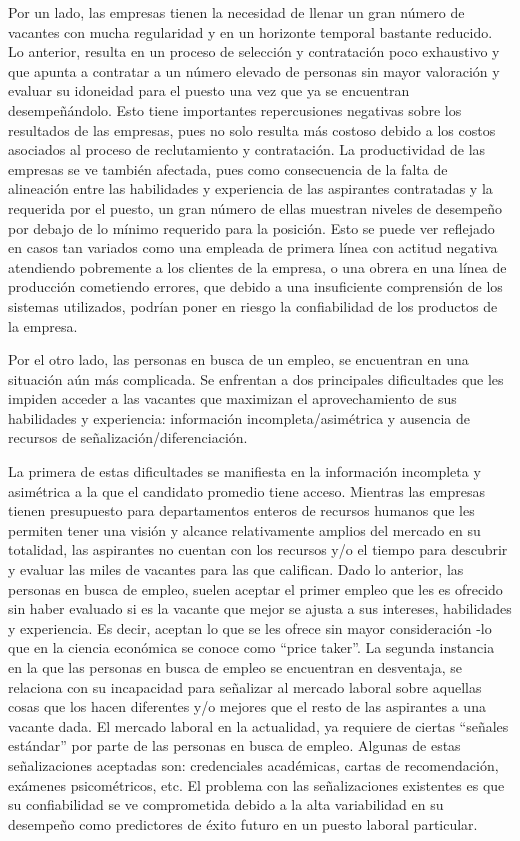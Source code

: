 Por un lado, las empresas tienen la necesidad de llenar un gran número de vacantes con mucha regularidad y en un horizonte temporal bastante reducido. Lo anterior, resulta en un proceso de selección y contratación poco exhaustivo y que apunta a contratar a un número elevado de personas sin mayor valoración y evaluar su idoneidad para el puesto una vez que ya se encuentran desempeñándolo. Esto tiene importantes repercusiones negativas sobre los resultados de las empresas, pues no solo resulta más costoso debido a los costos asociados al proceso de reclutamiento y contratación. La productividad de las empresas se ve también afectada, pues como consecuencia de la falta de alineación entre las habilidades y experiencia de las aspirantes contratadas y la requerida por el puesto, un gran número de ellas muestran niveles de desempeño por debajo de lo mínimo requerido para la posición. Esto se puede ver reflejado en casos tan variados como una empleada de primera línea con actitud negativa atendiendo pobremente a los clientes de la empresa, o una obrera en una línea de producción cometiendo errores, que debido a una insuficiente comprensión de los sistemas utilizados, podrían poner en riesgo la confiabilidad de los productos de la empresa.

Por el otro lado, las personas en busca de un empleo, se encuentran en una situación aún más complicada. Se enfrentan a dos principales dificultades que les impiden acceder a las vacantes que maximizan el aprovechamiento de sus habilidades y experiencia: información incompleta/asimétrica y ausencia de recursos de señalización/diferenciación.

La primera de estas dificultades se manifiesta en la información incompleta y asimétrica a la que el candidato promedio tiene acceso. Mientras las empresas tienen presupuesto para departamentos enteros de recursos humanos que les permiten tener una visión y alcance relativamente amplios del mercado en su totalidad, las aspirantes no cuentan con los recursos y/o el tiempo para descubrir y evaluar las miles de vacantes para las que califican. Dado lo anterior, las personas en busca de empleo, suelen aceptar el primer empleo que les es ofrecido sin haber evaluado si es la vacante que mejor se ajusta a sus intereses, habilidades y experiencia. Es decir, aceptan lo que se les ofrece sin mayor consideración -lo que en la ciencia económica se conoce como “price taker”.
La segunda instancia en la que las personas en busca de empleo se encuentran en desventaja, se relaciona con su incapacidad para señalizar al mercado laboral sobre aquellas cosas que los hacen diferentes y/o mejores que el resto de las aspirantes a una vacante dada. El mercado laboral en la actualidad, ya requiere de ciertas “señales estándar” por parte de las personas en busca de empleo. Algunas de estas señalizaciones aceptadas son: credenciales académicas, cartas de recomendación, exámenes psicométricos, etc. El problema con las señalizaciones existentes es que su confiabilidad se ve comprometida debido a la alta variabilidad en su desempeño como predictores de éxito futuro en un puesto laboral particular. 

